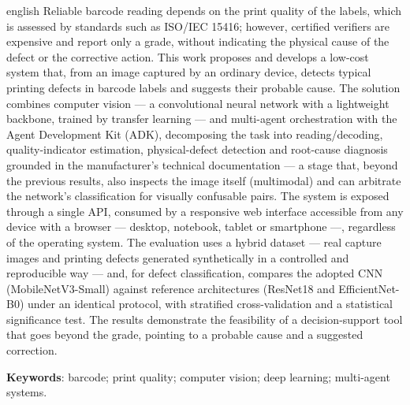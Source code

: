 \documentclass[
	article,			%
	11pt,				%
	oneside,			%
	a4paper,			%
	english,			%
	brazilian,			%
	sumario=tradicional
	]{abntex2}
\begin{document}
\begin{resumoumacoluna}[Abstract]
\begin{otherlanguage*}{english}
Reliable barcode reading depends on the print quality of the labels, which is
assessed by standards such as ISO/IEC 15416; however, certified verifiers are
expensive and report only a grade, without indicating the physical cause of the
defect or the corrective action. This work proposes and develops a low-cost
system that, from an image captured by an ordinary device, detects typical
printing defects in barcode labels and suggests their probable cause. The
solution combines computer vision --- a convolutional neural network with a
lightweight backbone, trained by transfer learning --- and multi-agent
orchestration with the Agent Development Kit (ADK), decomposing the task into
reading/decoding, quality-indicator estimation, physical-defect detection and
root-cause diagnosis grounded in the manufacturer's technical documentation --- a
stage that, beyond the previous results, also inspects the image itself
(multimodal) and can arbitrate the network's classification for visually
confusable pairs. The
system is exposed through a single API, consumed by a responsive web interface
accessible from any device with a browser --- desktop, notebook, tablet or
smartphone ---, regardless of the operating system. The evaluation uses a hybrid
dataset --- real capture images and printing defects generated synthetically in a
controlled and reproducible way --- and, for defect classification, compares the
adopted CNN (MobileNetV3-Small) against reference architectures (ResNet18 and
EfficientNet-B0) under an identical protocol, with stratified cross-validation and
a statistical significance test. The results demonstrate the feasibility of a
decision-support tool that goes beyond the grade, pointing to a probable cause and
a suggested correction.

\noindent
\textbf{Keywords}: barcode; print quality; computer vision; deep learning;
multi-agent systems.
\end{otherlanguage*}
\end{resumoumacoluna}

\tableofcontents*
\newpage

\textual
\end{document}
